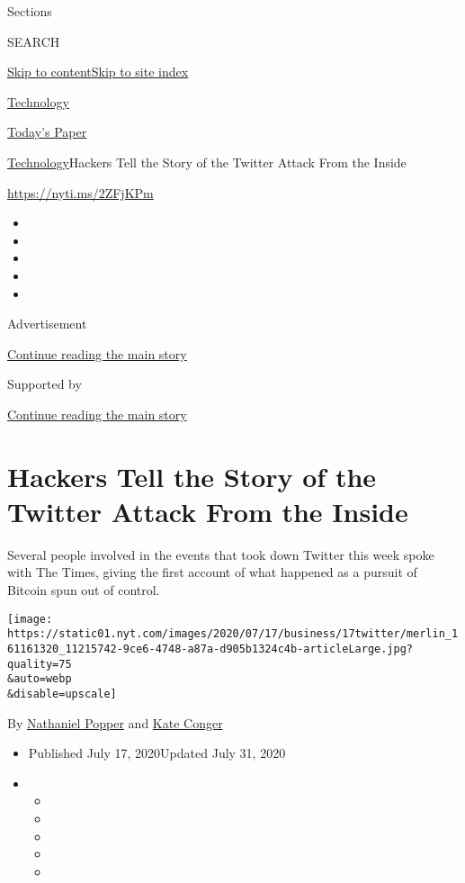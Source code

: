 Sections

SEARCH

\protect\hyperlink{site-content}{Skip to
content}\protect\hyperlink{site-index}{Skip to site index}

\href{https://www.nytimes.com/section/technology}{Technology}

\href{https://myaccount.nytimes.com/auth/login?response_type=cookie\&client_id=vi}{}

\href{https://www.nytimes.com/section/todayspaper}{Today's Paper}

\href{/section/technology}{Technology}\textbar{}Hackers Tell the Story
of the Twitter Attack From the Inside

\url{https://nyti.ms/2ZFjKPm}

\begin{itemize}
\item
\item
\item
\item
\item
\end{itemize}

Advertisement

\protect\hyperlink{after-top}{Continue reading the main story}

Supported by

\protect\hyperlink{after-sponsor}{Continue reading the main story}

\hypertarget{hackers-tell-the-story-of-the-twitter-attack-from-the-inside}{%
\section{Hackers Tell the Story of the Twitter Attack From the
Inside}\label{hackers-tell-the-story-of-the-twitter-attack-from-the-inside}}

Several people involved in the events that took down Twitter this week
spoke with The Times, giving the first account of what happened as a
pursuit of Bitcoin spun out of control.

\texttt{[image: https://static01.nyt.com/images/2020/07/17/business/17twitter/merlin\_161161320\_11215742-9ce6-4748-a87a-d905b1324c4b-articleLarge.jpg?quality=75\\\&auto=webp\\\&disable=upscale]}

By \href{https://www.nytimes.com/by/nathaniel-popper}{Nathaniel Popper}
and \href{https://www.nytimes.com/by/kate-conger}{Kate Conger}

\begin{itemize}
\item
  Published July 17, 2020Updated July 31, 2020
\item
  \begin{itemize}
  \item
  \item
  \item
  \item
  \item
  \end{itemize}
\end{itemize}

